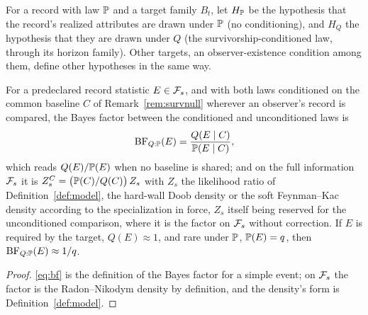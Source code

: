 \begin{definition}\label{def:hyps}
For a record with law $\mathbb{P}$ and a target family $B_t$, let $H_{\mathbb{P}}$ be the
hypothesis that the record's realized attributes are drawn under $\mathbb{P}$
(no conditioning), and $H_Q$ the hypothesis that they are drawn under
$Q$ (the survivorship-conditioned law, through its horizon family). Other
targets, an observer-existence condition among them, define other
hypotheses in the same way.
\end{definition}

\begin{proposition}\label{prop:bf}
For a predeclared record statistic $E\in\mathcal{F}_s$, and with both laws
conditioned on the common baseline $C$ of Remark~\ref{rem:survnull}
wherever an observer's record is compared, the Bayes factor between the
conditioned and unconditioned laws is
\begin{equation}\label{eq:bf}
\mathrm{BF}_{Q:\mathbb{P}}(E)=\frac{Q(E\mid C)}{\mathbb{P}(E\mid C)},
\end{equation}
which reads $Q(E)/\mathbb{P}(E)$ when no baseline is shared;
and on the full information $\mathcal{F}_s$ it is $Z^{C}_s = \bigl(\mathbb{P}(C)/Q(C)\bigr)\, Z_s$ with $Z_s$ the likelihood ratio of Definition~\ref{def:model}, the hard-wall Doob density or the soft Feynman--Kac density according to the specialization in force, $Z_s$ itself being reserved for the unconditioned comparison, where it is the factor on $\mathcal{F}_s$ without correction. If $E$ is required by the
target, $Q(E)\approx1$, and rare under $\mathbb{P}$, $\mathbb{P}(E)=q$, then
$\mathrm{BF}_{Q:\mathbb{P}}(E)\approx1/q$.
\end{proposition}

\begin{proof}
\eqref{eq:bf} is the definition of the Bayes factor for a simple event;
on $\mathcal{F}_s$ the factor is the Radon--Nikodym density by definition, and the
density's form is Definition~\ref{def:model}.
\end{proof}

